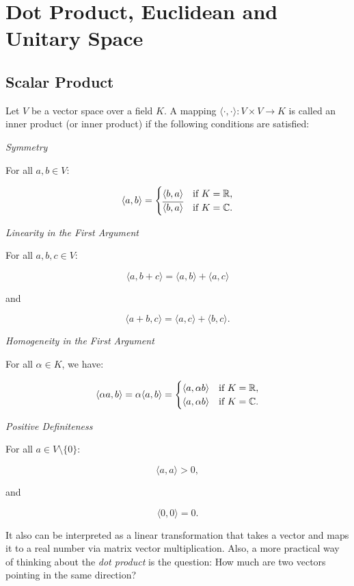\newpage
\section{Dot Product, Euclidean and Unitary Space}

\subsection{Scalar Product}

Let \(V\) be a vector space over a field \(K\). A mapping \(\langle \cdot, \cdot \rangle : V \times V 
\to K\) is called an inner product (or inner product) if the following conditions are satisfied:

\emph{Symmetry}

For all \(a, b \in V\):

\[
    \langle a, b \rangle = 
    \begin{cases}
    \langle b, a \rangle & \text{if } K = \mathbb{R}, \\
    \overline{\langle b, a \rangle} & \text{if } K = \mathbb{C}.
    \end{cases}
\]

\emph{Linearity in the First Argument}

For all \(a, b, c \in V\):

\[
    \langle a, b + c \rangle = \langle a, b \rangle + \langle a, c \rangle
\]

and

\[
    \langle a + b, c \rangle = \langle a, c \rangle + \langle b, c \rangle.
\]

\emph{Homogeneity in the First Argument}

For all \(\alpha \in K\), we have:

\[
    \langle \alpha a, b \rangle = \alpha \langle a, b \rangle = 
    \begin{cases}
    \langle a, \alpha b \rangle & \text{if } K = \mathbb{R}, \\
    \langle a, \alpha b \rangle & \text{if } K = \mathbb{C}.
    \end{cases}
\]

\emph{Positive Definiteness}

For all \(a \in V \setminus \{0\}\):

\[
    \langle a, a \rangle > 0,
\]

and

\[
    \langle 0, 0 \rangle = 0.
\]

It also can be interpreted as a linear transformation that takes a vector and maps it to a real number
 via matrix vector multiplication. Also, a more practical way of thinking about the 
 \emph{dot product} is the question: How much are two vectors pointing in the same direction?

